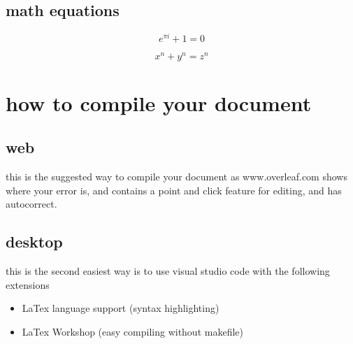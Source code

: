 \subsection{math equations}

\[
e^{\pi i} + 1 = 0
\]

\[
x^n + y^n = z^n
\]

\section{how to compile your document}
\subsection{web}
this is the suggested way to compile your document as www.overleaf.com shows where your error is,
and contains a point and click feature for editing, and has autocorrect.
\subsection{desktop}
this is the second easiest way is to use visual studio code with the following extensions
\begin{itemize}
	\item LaTex language support (syntax highlighting)
	\item LaTex Workshop (easy compiling without makefile)
\end{itemize}

